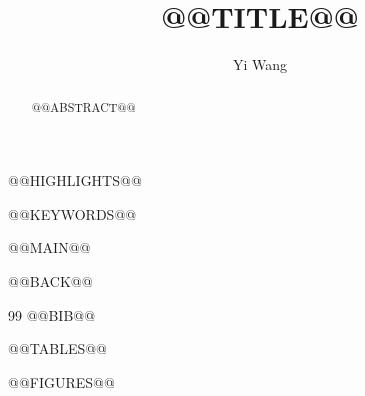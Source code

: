 \documentclass[preprint,12pt]{elsarticle}
\begin{document}
\begin{frontmatter}

\title{@@TITLE@@}

\author{Yi Wang}

\begin{abstract}
@@ABSTRACT@@
\end{abstract}

\begin{highlights}
@@HIGHLIGHTS@@
\end{highlights}

\begin{keyword}
@@KEYWORDS@@
\end{keyword}

\end{frontmatter}

\linenumbers

@@MAIN@@

@@BACK@@

\begin{thebibliography}{99}
@@BIB@@
\end{thebibliography}

\clearpage
@@TABLES@@

\clearpage
@@FIGURES@@
\end{document}
